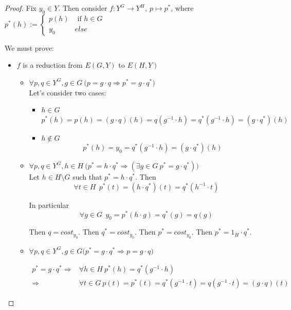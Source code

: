 \documentclass[a4paper,12pt]{article}
\theoremstyle{plain}
\theoremstyle{definition}
\theoremstyle{remark}
\begin{document}
\begin{proof}
	Fix $y_0 \in Y$. Then consider $f: Y^G \to Y^H, \ p \mapsto p^{*}$, where 
	$p^{*}(h) := 
	\begin{cases}
		p(h) & \text{ if } h \in G  \\
		y_0  & else
	\end{cases}
	$

	We must prove:
	\begin{itemize}
		\item $f$ is a reduction from $E(G,Y)$ to $E(H,Y)$ \\
			\begin{itemize}
				\item $\forall p,q \in Y^{G}, g \in G \ \bigg( p = g \cdot q \Rightarrow p^{*} = g \cdot q^{*} \bigg)$ \\

					Let's consider two cases:
					\begin{itemize}
						\item $h \in G$
							\[
								p^{*} (h) = p(h) = (g \cdot q)(h) = 
								q(g^{-1} \cdot h) = q^{*}(g^{-1} \cdot h) =
								(g \cdot q^{*})(h)
							\]
						\item $h \not \in G$ 
							\[
								p^{*} (h) = y_0 = q^{*}(g^{-1} \cdot h) = (g \cdot q^{*})(h)
							\]

					\end{itemize}

				\item $\forall p,q \in Y^{G}, h \in H \ 
					\bigg( p^{*} = h \cdot q^{*} \Rightarrow (\exists g \in G \ p^{*} = g \cdot q^{*}) \bigg)$ \\

					Let $h \in H \setminus G$ such that $p^{*} = h \cdot q^{*}$.
					Then 
					\[
						\forall t \in H \ \ 
						p^{*}(t) = (h \cdot q^{*})(t) = q^{*}(h^{-1} \cdot t)
					\]
					
					In particular 
					\[
						\forall g \in G \ \ y_0 = p^{*}(h \cdot g) = q^{*}(g) = q(g)
					\]

					Then $q = cost_{y_0}$. Then $q^{*} = cost_{y_0}$. Then $p^{*} = cost_{y_0}$.
					Then $p^{*} = 1_{H} \cdot q^{*}$.


				\item $\forall p,q \in Y^{G}, g \in G 
					\bigg( p^{*} = g \cdot q^{*} \Rightarrow p = g \cdot q \bigg) $ 

					\begin{align*}
						p^{*} = g \cdot q^{*} \Rightarrow & \forall h \in H \ p^{*}(h) = q^{*}(g^{-1} \cdot h) \\
						\Rightarrow & \forall t \in G \ p(t) = p^{*}(t) = q^{*}(g^{-1} \cdot t) = 
										q(g^{-1} \cdot t) = (g \cdot q)(t)
					\end{align*}
			\end{itemize}


\end{itemize}
\end{proof}
\end{document}
